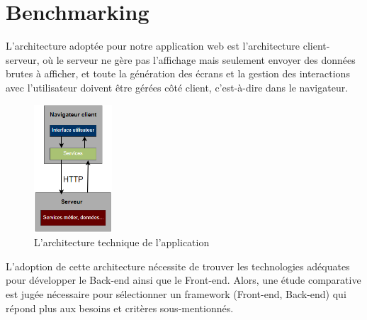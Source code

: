 
\section{Benchmarking}
L'architecture adoptée pour notre application web est l'architecture client-serveur, où le serveur ne gère pas l’affichage mais seulement envoyer des données brutes à afficher, et toute la génération des écrans et la gestion des interactions avec l’utilisateur doivent être gérées côté client, c’est-à-dire dans le navigateur.\\
\begin{figure}[h!]  
 \centering
    \includegraphics[width=0.26\textwidth]{chapitre3/Figures/client-serveur.png}
  \caption{L'architecture technique de l'application}
\end{figure}
\newpage
L’adoption de cette architecture nécessite de trouver les technologies adéquates pour développer le Back-end ainsi que le Front-end.  Alors, une étude comparative est jugée nécessaire pour sélectionner un framework (Front-end, Back-end) qui répond plus aux besoins et critères sous-mentionnés.
